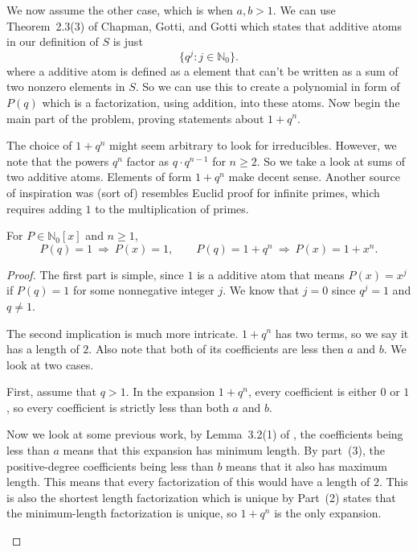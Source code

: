 \documentclass[11pt]{scrartcl}
\begin{document}
\begin{soln}
    \subsubsection*{}

	We now assume the other case, which is when $a,b >1$. We can use Theorem~2.3(3) of Chapman, Gotti, and Gotti
    \cite{p7-chapman-gotti-gotti} which states that additive atoms in our 
	definition of $S$ is just 
    \[
    \{q^j:j\in\mathbb N_0\}.
    \]
	where a additive atom is defined as a element that can't be written as a
	sum of two nonzero elements in $S$. 
	So we can use this to create a polynomial in form of $P(q)$ 
	which is a factorization, using addition, into these atoms. 
	Now begin the main part of the problem, proving statements about $1+q^n$. 
    \begin{remark}
The choice of $1+q^n$ might seem arbitrary to look for 
irreducibles. However, we note that the
powers $q^n$ factor as $q\cdot q^{n-1}$ for $n\ge2$. So we take a look 
at sums of two additive atoms. Elements of form $1+q^n$ make decent sense. 
Another source of inspiration was (sort of) resembles Euclid 
proof for infinite primes, which requires adding $1$ to the multiplication of primes. 
    \end{remark}
    \begin{claim*}
        For $P\in\mathbb N_0[x]$ and $n\ge1$,
        \[
        P(q)=1\ \Longrightarrow\ P(x)=1,
        \qquad
        P(q)=1+q^n\ \Longrightarrow\ P(x)=1+x^n.
        \]
    \end{claim*}

    \begin{proof}
		The first part is simple, since $1$ is a additive atom that means $P(x)=x^j$ if $P(q)=1$ for some nonnegative
		integer $j$. We know that $j=0$ since $q^j=1$ and $q \ne 1$. 

		The second implication is much more intricate. 
        $1+q^n$ has two terms, so we say it has a length of  $2$. Also note that both of 
        its coefficients are less then $a$ and $b$. We look at two cases.

      \begin{subproof}
    First, assume that $q>1$. In the expansion $1+q^n$, every coefficient
    is either $0$ or $1$, so every coefficient is strictly less
    than both $a$ and $b$.

    Now we look at some previous work, by  Lemma~3.2(1) of \cite{p7-chapman-gotti-gotti},
    the coefficients being less than $a$ means that this
    expansion has minimum length. By part~(3), the
    positive-degree coefficients being less than $b$ means
    that it also has maximum length.
        This means that every factorization of this would have a length of $2$. This is also the shortest
        length factorization which is unique by Part~(2) states that the minimum-length
    factorization is unique, so $1+q^n$ is the only expansion.
\end{subproof}


\end{proof}
\end{soln}
\end{document}
